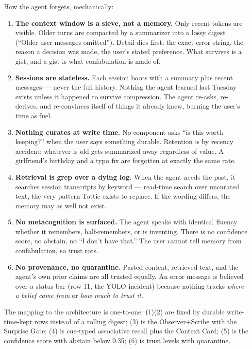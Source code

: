 How the agent forgets, mechanically:
\begin{enumerate}
  \item \textbf{The context window is a sieve, not a memory.} Only recent tokens are
  visible. Older turns are compacted by a summarizer into a lossy digest (``Older user
  messages omitted''). Detail dies first: the exact error string, the reason a decision
  was made, the user's stated preference. What survives is a gist, and a gist is what
  confabulation is made of.
  \item \textbf{Sessions are stateless.} Each session boots with a summary plus recent
  messages --- never the full history. Nothing the agent learned last Tuesday exists
  unless it happened to survive compression. The agent re-asks, re-derives, and
  re-convinces itself of things it already knew, burning the user's time as fuel.
  \item \textbf{Nothing curates at write time.} No component asks ``is this worth
  keeping?'' when the user says something durable. Retention is by recency accident:
  whatever is old gets summarized away regardless of value. A girlfriend's birthday and
  a typo fix are forgotten at exactly the same rate.
  \item \textbf{Retrieval is grep over a dying log.} When the agent needs the past, it
  searches session transcripts by keyword --- read-time search over uncurated text, the
  very pattern Tottie exists to replace. If the wording differs, the memory may as well
  not exist.
  \item \textbf{No metacognition is surfaced.} The agent speaks with identical fluency
  whether it remembers, half-remembers, or is inventing. There is no confidence score,
  no abstain, no ``I don't have that.'' The user cannot tell memory from confabulation,
  so trust rots.
  \item \textbf{No provenance, no quarantine.} Pasted content, retrieved text, and the
  agent's own prior claims are all trusted equally. An error message is believed over a
  status bar (row 11, the YOLO incident) because nothing tracks \emph{where a belief
  came from} or \emph{how much to trust it}.
\end{enumerate}
The mapping to the architecture is one-to-one: (1)(2) are fixed by durable
write-time-kept rows instead of a rolling digest; (3) is the Observer+Scribe with the
Surprise Gate; (4) is cue-typed associative recall plus the Context Card; (5) is the
confidence score with abstain below 0.35; (6) is trust levels with quarantine.


